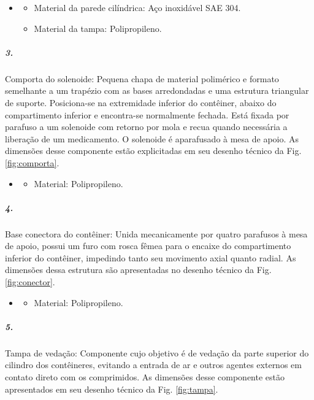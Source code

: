    \begin{itemize}
   \item[]
   \begin{itemize}
       \item  Material da parede cilíndrica: Aço inoxidável SAE 304.
       \item  Material da tampa: Polipropileno.
   \end{itemize}
   \end{itemize}
     
    
    \subparagraph*{3.} \label{retorno_comporta}
    Comporta do solenoide: Pequena chapa de material polimérico e formato semelhante a um trapézio com as bases arredondadas e uma estrutura triangular de suporte. Posiciona-se na extremidade inferior do contêiner, abaixo do compartimento inferior e encontra-se normalmente fechada. Está fixada por parafuso a um solenoide com retorno por mola e recua quando necessária a liberação de um medicamento. O solenoide é aparafusado à mesa de apoio. As dimensões desse componente estão explicitadas em seu desenho técnico da Fig. \ref{fig:comporta}.
    
     \begin{itemize}
   \item[]
   \begin{itemize}
       \item  Material: Polipropileno.
   \end{itemize}
   \end{itemize}
    
    
    \subparagraph*{4.}\label{retorno_conector}
    Base conectora do contêiner: Unida mecanicamente por quatro parafusos à mesa de apoio, possui um furo com rosca fêmea para o encaixe do compartimento inferior do contêiner, impedindo tanto seu movimento axial quanto radial. As dimensões dessa estrutura são apresentadas no desenho técnico da  Fig. \ref{fig:conector}.
    
    \begin{itemize}
   \item[]
   \begin{itemize}
       \item  Material: Polipropileno.
   \end{itemize}
   \end{itemize}
         
     
     \subparagraph*{5.}\label{retorno_tampa}
     Tampa de vedação: Componente cujo objetivo é de vedação da parte superior do cilindro dos contêineres, evitando a entrada de ar e outros agentes externos em contato direto com os comprimidos. As dimensões desse componente estão apresentados em seu desenho técnico  da Fig. \ref{fig:tampa}.
     
